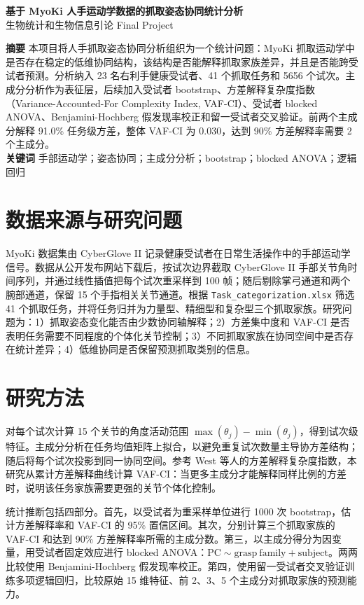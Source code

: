 \documentclass[10pt,a4paper]{ctexart}
\begin{document}
\begin{center}
{\Large \bfseries 基于 MyoKi 人手运动学数据的抓取姿态协同统计分析}\\[4pt]
{\normalsize 生物统计和生物信息引论 Final Project}\\[2pt]
\end{center}
\noindent\textbf{摘要} 本项目将人手抓取姿态协同分析组织为一个统计问题：MyoKi 抓取运动学中是否存在稳定的低维协同结构，该结构是否能解释抓取家族差异，并且是否能跨受试者预测。分析纳入 23 名右利手健康受试者、41 个抓取任务和 5656 个试次。主成分分析作为表征层，后续加入受试者 bootstrap、方差解释复杂度指数（Variance-Accounted-For Complexity Index, VAF-CI）、受试者 blocked ANOVA、Benjamini-Hochberg 假发现率校正和留一受试者交叉验证。前两个主成分解释 91.0\% 任务级方差，整体 VAF-CI 为 0.030，达到 90\% 方差解释率需要 2 个主成分。\\
\textbf{关键词} 手部运动学；姿态协同；主成分分析；bootstrap；blocked ANOVA；逻辑回归

\section{数据来源与研究问题}
MyoKi 数据集由 CyberGlove II 记录健康受试者在日常生活操作中的手部运动学信号。数据从公开发布网站下载后，按试次边界截取 CyberGlove II 手部关节角时间序列，并通过线性插值把每个试次重采样到 100 帧；随后剔除掌弓通道和两个腕部通道，保留 15 个手指相关关节通道。根据 \texttt{Task\_categorization.xlsx} 筛选 41 个抓取任务，并将任务归并为力量型、精细型和复杂型三个抓取家族。研究问题为：1）抓取姿态变化能否由少数协同轴解释；2）方差集中度和 VAF-CI 是否表明任务需要不同程度的个体化关节控制；3）不同抓取家族在协同空间中是否存在统计差异；4）低维协同是否保留预测抓取类别的信息。

\section{研究方法}
对每个试次计算 15 个关节的角度活动范围 $\max(\theta_j)-\min(\theta_j)$，得到试次级特征。主成分分析在任务均值矩阵上拟合，以避免重复试次数量主导协方差结构；随后将每个试次投影到同一协同空间。参考 West 等人的方差解释复杂度指数，本研究从累计方差解释曲线计算 VAF-CI：当更多主成分才能解释同样比例的方差时，说明该任务家族需要更强的关节个体化控制。

统计推断包括四部分。首先，以受试者为重采样单位进行 1000 次 bootstrap，估计方差解释率和 VAF-CI 的 95\% 置信区间。其次，分别计算三个抓取家族的 VAF-CI 和达到 90\% 方差解释率所需的主成分数。第三，以主成分得分为因变量，用受试者固定效应进行 blocked ANOVA：$\mathrm{PC} \sim \mathrm{grasp\ family} + \mathrm{subject}$。两两比较使用 Benjamini-Hochberg 假发现率校正。第四，使用留一受试者交叉验证训练多项逻辑回归，比较原始 15 维特征、前 2、3、5 个主成分对抓取家族的预测能力。
\end{document}
